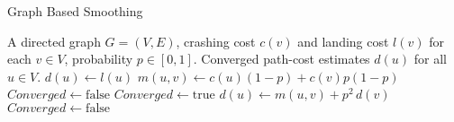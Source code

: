 \begin{algorithm}[htbp]
  \caption{Graph Based Smoothing}
  \label{alg:flow}
  \begin{algorithmic}[1]
    \Require A directed graph \(G=(V,E)\), crashing cost \(c(v)\) and landing cost \(l(v)\) for each \(v\in V\), probability \(p\in[0,1]\).
    \Ensure Converged path-cost estimates \(d(u)\) for all \(u\in V\).
      \State \(d(u)\gets l(u)\) 
    \EndFor
     
      \State \(m(u, v) \gets c(u)(1-p) + c(v)p(1-p)\) 
    \EndFor
    \State \(\mathit{Converged}\gets \text{false}\)
      \State \(\mathit{Converged}\gets \text{true}\)
          \State \(d(u)\gets m(u, v) + p^2\,d(v)\)
          \State \(\mathit{Converged}\gets \text{false}\)
        \EndIf
      \EndFor
    \EndWhile
  \end{algorithmic}
\end{algorithm}
